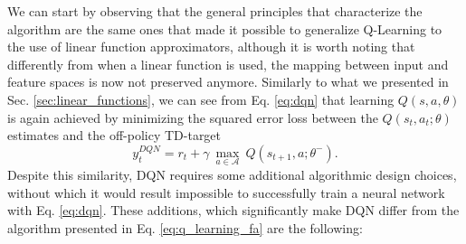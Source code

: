 We can start by observing that the general principles that characterize the algorithm are the same ones that made it possible to generalize Q-Learning to the use of linear function approximators, although it is worth noting that differently from when a linear function is used, the mapping between input and feature spaces is now not preserved anymore. Similarly to what we presented in Sec. \ref{sec:linear_functions}, we can see from Eq. \ref{eq:dqn} that learning $Q(s,a,\theta)$ is again achieved by minimizing the squared error loss between the $Q(s_t,a_t;\theta)$ estimates and the off-policy TD-target
\begin{equation}
    y^{DQN}_{t} = r_{t} + \gamma \: \underset{a\in \mathcal{A}}{\max}\: Q(s_{t+1}, a; \theta^{-}).
\label{eq:dqn_td}
\end{equation}
Despite this similarity, DQN requires some additional algorithmic design choices, without which it would result impossible to successfully train a neural network with Eq. \ref{eq:dqn}. These additions, which significantly make DQN differ from the algorithm presented in Eq. \ref{eq:q_learning_fa} are the following:
